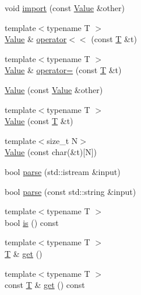 \begin{DoxyCompactItemize}
\item 
void \hyperlink{classjsonxx_1_1_value_a0b1236b64e06fc13e11e6d00174ced91}{import} (const \hyperlink{classjsonxx_1_1_value}{Value} \&other)
\item 
{\footnotesize template$<$typename T $>$ }\\\hyperlink{classjsonxx_1_1_value}{Value} \& \hyperlink{classjsonxx_1_1_value_a1e517930ae7165463902448438ff37f9}{operator$<$$<$} (const \hyperlink{http__parser_8c_ad24d0de3f597ca60dd95c4bc59c2ff73}{T} \&t)
\item 
{\footnotesize template$<$typename T $>$ }\\\hyperlink{classjsonxx_1_1_value}{Value} \& \hyperlink{classjsonxx_1_1_value_a99b6ad0425396282570c175a0ce33d46}{operator=} (const \hyperlink{http__parser_8c_ad24d0de3f597ca60dd95c4bc59c2ff73}{T} \&t)
\item 
\hyperlink{classjsonxx_1_1_value_a043b4fd42c972d41a19aeeea087e8b0e}{Value} (const \hyperlink{classjsonxx_1_1_value}{Value} \&other)
\item 
{\footnotesize template$<$typename T $>$ }\\\hyperlink{classjsonxx_1_1_value_aee701407f5c79923d2d12501d63a0186}{Value} (const \hyperlink{http__parser_8c_ad24d0de3f597ca60dd95c4bc59c2ff73}{T} \&t)
\item 
{\footnotesize template$<$size\+\_\+t N$>$ }\\\hyperlink{classjsonxx_1_1_value_a80bb965461a78b8fb3dc79a160271236}{Value} (const char(\&t)\mbox{[}N\mbox{]})
\item 
bool \hyperlink{classjsonxx_1_1_value_a7f8013d2eedaf1f2ae25cddf549672a7}{parse} (std\+::istream \&input)
\item 
bool \hyperlink{classjsonxx_1_1_value_a217b0c643ec0aca7100dba4675a8e32a}{parse} (const std\+::string \&input)
\item 
{\footnotesize template$<$typename T $>$ }\\bool \hyperlink{classjsonxx_1_1_value_a33db42bf7cd0bcecceb7301a79b6472e}{is} () const 
\item 
{\footnotesize template$<$typename T $>$ }\\\hyperlink{http__parser_8c_ad24d0de3f597ca60dd95c4bc59c2ff73}{T} \& \hyperlink{classjsonxx_1_1_value_a005e7c83c9c76d602f1bcce60bf0780d}{get} ()
\item 
{\footnotesize template$<$typename T $>$ }\\const \hyperlink{http__parser_8c_ad24d0de3f597ca60dd95c4bc59c2ff73}{T} \& \hyperlink{classjsonxx_1_1_value_afdf90e84e03877790afcbf2ff2dd96a9}{get} () const 

\end{DoxyCompactItemize}
